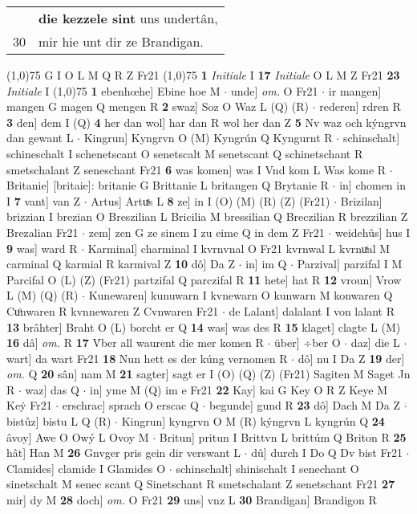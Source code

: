\documentclass[8pt,a4paper,notitlepage]{article}
\begin{document}
\begin{table}[ht]
\begin{minipage}[t]{0.5\linewidth}
\begin{tabular}{rl}
 & \textbf{die kezzele sint} uns undertân,\\ 
30 & mir hie unt dir ze Brandigan.\\ 
\end{tabular}
\scriptsize
\line(1,0){75} \newline
G I O L M Q R Z Fr21 \newline
\line(1,0){75} \newline
\textbf{1} \textit{Initiale} I  \textbf{17} \textit{Initiale} O L M Z Fr21  \textbf{23} \textit{Initiale} I  \newline
\line(1,0){75} \newline
\textbf{1} ebenhœhe] Ebine hoe M  $\cdot$ unde] \textit{om.} O Fr21  $\cdot$ ir mangen] mangen G magen Q mengen R \textbf{2} swaz] Soz O Waz L (Q) (R)  $\cdot$ rederen] rdren R \textbf{3} den] dem I (Q) \textbf{4} her dan wol] har dan R wol her dan Z \textbf{5} Nv waz och kýngrvn dan gewant L  $\cdot$ Kingrun] Kyngrvn O (M) Kyngrún Q Kyngurnt R  $\cdot$ schinschalt] schineschalt I schenetscant O senetscalt M senetscant Q schinetschant R smetschalant Z seneschant Fr21 \textbf{6} was komen] was I Vnd kom L Was kome R  $\cdot$ Britanie] [britaie]: britanie G Brittanie L britangen Q Brytanie R  $\cdot$ in] chomen in I \textbf{7} vant] van Z  $\cdot$ Artus] Artuͯs L \textbf{8} ze] in I (O) (M) (R) (Z) (Fr21)  $\cdot$ Brizilan] brizzian I brezian O Breszilian L Bricilia M bressilian Q Breczilian R brezzilian Z Brezalian Fr21  $\cdot$ zem] zen G ze sinem I zu eime Q in dem Z Fr21  $\cdot$ weidehûs] hus I \textbf{9} was] ward R  $\cdot$ Karminal] charminal I kvrnvnal O Fr21 kvrnwal L kvrnuͯal M carminal Q karmial R karmival Z \textbf{10} dô] Da Z  $\cdot$ in] im Q  $\cdot$ Parzival] parzifal I M Parcifal O (L) (Z) (Fr21) partzifal Q parczifal R \textbf{11} hete] hat R \textbf{12} vroun] Vrow L (M) (Q) (R)  $\cdot$ Kunewaren] kunuwarn I kvnewarn O kunwarn M konwaren Q Cuͦnwaren R kvnnewaren Z Cvnwaren Fr21  $\cdot$ de Lalant] dalalant I von lalant R \textbf{13} brâhter] Braht O (L) borcht er Q \textbf{14} was] was des R \textbf{15} klaget] clagte L (M) \textbf{16} dâ] \textit{om.} R \textbf{17} V́ber all waurent die mer komen R  $\cdot$ über] ÷ber O  $\cdot$ daz] die L  $\cdot$ wart] da wart Fr21 \textbf{18} Nun hett es der kúng vernomen R  $\cdot$ dô] nu I Da Z \textbf{19} der] \textit{om.} Q \textbf{20} sân] nam M \textbf{21} sagter] sagt er I (O) (Q) (Z) (Fr21) Sagiten M Saget Jn R  $\cdot$ waz] das Q  $\cdot$ in] yme M (Q) im e Fr21 \textbf{22} Kay] kai G Key O R Z Keye M Keẏ Fr21  $\cdot$ erschrac] sprach O erscac Q  $\cdot$ begunde] gund R \textbf{23} dô] Dach M Da Z  $\cdot$ bistûz] bistu L Q (R)  $\cdot$ Kingrun] kyngrvn O M (R) kýngrvn L kyngrún Q \textbf{24} âvoy] Awe O Owý L Ovoy M  $\cdot$ Britun] pritun I Brittvn L brittúm Q Briton R \textbf{25} hât] Han M \textbf{26} Gnvger pris gein dir verswant L  $\cdot$ dû] durch I Do Q Dv bist Fr21  $\cdot$ Clamides] clamide I Glamides O  $\cdot$ schinschalt] shinischalt I senechant O sinetschalt M senec scant Q Sinetschant R smetschalant Z senetschant Fr21 \textbf{27} mir] dy M \textbf{28} doch] \textit{om.} O Fr21 \textbf{29} uns] vnz L \textbf{30} Brandigan] Brandigon R \newline

\end{minipage}
\end{table}
\end{document}
